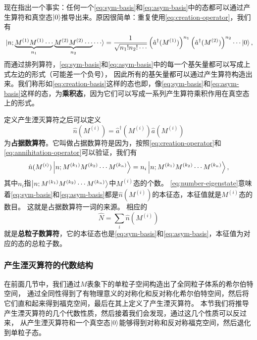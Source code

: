 \documentclass[UTF8, a4paper]{ctexart}
\begin{document}
现在指出一个事实：任何一个\eqref{eq:sym-basis}和\eqref{eq:asym-basis}中的态都可以通过产生算符和真空态$\ket{0}$推导出来。原因很简单：重复使用\eqref{eq:creation-operator}，我们有
\begin{equation}
    \ket*{n; \underbrace{M^{(1)} M^{(1)} \cdots}_{n_1} \underbrace{M^{(2)} M^{(2)} \cdots}_{n_2} \cdots} = \frac{1}{\sqrt{n_1! n_2! \cdots}} \left(\hat{a}^\dagger (M^{(1)})\right)^{n_1} \left(\hat{a}^\dagger (M^{(2)})\right)^{n_2} \cdots \ket{0},
    \label{eq:creation-basis}
\end{equation}
而通过排列算符，\eqref{eq:sym-basis}和\eqref{eq:asym-basis}中的每一个基矢量都可以写成上式左边的形式（可能差一个负号），
因此所有的基矢量都可以通过产生算符构造出来。我们称形如\eqref{eq:creation-basis}这样的态也即，像\eqref{eq:sym-basis}和\eqref{eq:asym-basis}这样的态，为\textbf{乘积态}，因为它们可以写成一系列产生算符乘积作用在真空态上的形式。

定义产生湮灭算符之后可以定义
\begin{equation}
    \hat{n}(M^{(i)}) = \hat{a}^\dagger (M^{(i)}) \hat{a} (M^{(i)})
    \label{eq:number-operator}
\end{equation}
为\textbf{占据数算符}。它叫做占据数算符是因为，按照\eqref{eq:creation-operator}和\eqref{eq:annihitation-operator}可以验证，我们有
\begin{equation}
    \hat{n}(M^{(i)}) \ket{n; M^{(k_1)} M^{(k_2)} \cdots M^{(k_n)}} = n_i \ket{n; M^{(k_1)} M^{(k_2)} \cdots M^{(k_n)}},
    \label{eq:number-eigenstate}
\end{equation}
其中$n_i$指$\ket{n; M^{(k_1)} M^{(k_2)} \cdots M^{(k_n)}}$中$M^{(i)}$态的个数。
\eqref{eq:number-eigenstate}意味着\eqref{eq:sym-basis}和\eqref{eq:asym-basis}都是$\hat{n}(M^{(i)})$的本征态，本征值就是$M^{(i)}$态的数目。
这就是占据数算符一词的来源。
相应的
\begin{equation}
    \hat{N} = \sum_i \hat{n}(M^{(i)})
    \label{eq:total-number-operator}
\end{equation}
就是\textbf{总粒子数算符}，它的本征态也是\eqref{eq:sym-basis}和\eqref{eq:asym-basis}，本征值为对应的态的总粒子数。

\subsubsection{产生湮灭算符的代数结构}\label{sec:algebra-ca-op}

在前面几节中，我们通过$M$表象下的单粒子空间构造出了全同粒子体系的希尔伯特空间，
通过全同性得到了有物理意义的对称化和反对称化希尔伯特空间，然后将它们直和起来得到福克空间，最后在其上定义了产生湮灭算符。
本节我们将推导产生湮灭算符的几个代数性质，然后接着我们会发现，通过这几个性质可以反过来，
从产生湮灭算符和一个真空态$\ket{0}$能够得到对称和反对称福克空间，然后退化到单粒子态。
\end{document}
